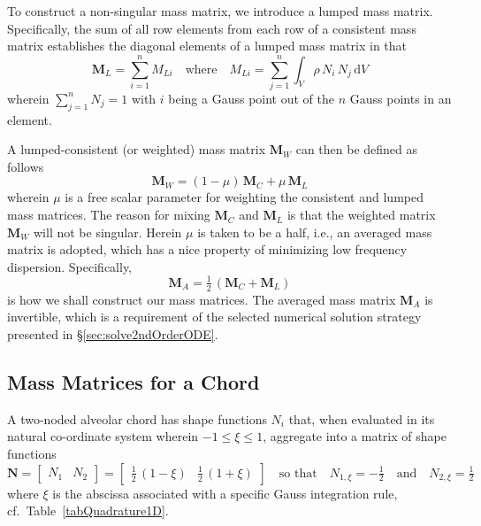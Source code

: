 To construct a non-singular mass matrix, we introduce a lumped mass matrix.  Specifically, the sum of all row elements from each row of a consistent mass matrix establishes the diagonal elements of a lumped mass matrix \cite{Reddy93} in that
\begin{equation}
\mathbf{M}_L = \sum_{i=1}^n M_{Li} 
\quad \text{where} \quad
M_{Li} = \sum_{j=1}^n \int_{V} \rho \, N_i \, N_j \, \mathrm{d} V 
\label{lumpedMassMatrix}
\end{equation}
wherein $\sum_{j=1}^n N_j = 1$ with $i$ being a Gauss point out of the $n$ Gauss points in an element.

A lumped-consistent (or weighted) mass matrix $\mathbf{M}_W $ can then be defined as follows
\begin{equation}
\mathbf{M}_W  = (1 - \mu) \, \mathbf{M}_{C} + \mu \, \mathbf{M}_{L}
\end{equation}
wherein $\mu$ is a free scalar parameter for weighting the consistent and lumped mass matrices.  The reason for mixing $\mathbf{M}_C$ and $\mathbf{M}_L$ is that the weighted matrix $\mathbf{M}_W$ will not be singular.  Herein $\mu$ is taken to be a half, i.e., an averaged mass matrix is adopted, which has a nice property of minimizing low frequency dispersion.  Specifically,
\begin{equation}
\mathbf{M}_A  = \tfrac{1}{2} \, (\mathbf{M}_{C} + \mathbf{M}_{L})
\label{LumconsMass}
\end{equation}
is how we shall construct our mass matrices.  The averaged mass matrix $\mathbf{M}_A$ is invertible, which is a requirement of the selected numerical solution strategy presented in \S\ref{sec:solve2ndOrderODE}.

\subsection{Mass Matrices for a Chord}

A two-noded alveolar chord has shape functions $N_i$ that, when evaluated in its natural co-ordinate system wherein $-1 \leq \xi \leq 1$, aggregate into a matrix of shape functions
\begin{equation}
\mathbf{N} = \begin{bmatrix} N_1 & N_2 \end{bmatrix} =
\begin{bmatrix}
\frac{1}{2} \, (1 - \xi) &  \frac{1}{2} \, (1 + \xi)
\end{bmatrix} 
\quad \text{so that} \quad
N_{1,\xi} = -\tfrac{1}{2} 
\quad \text{and} \quad
N_{2,\xi} = \tfrac{1}{2}
\end{equation}
where $\xi$ is the abscissa associated with a specific Gauss integration rule, cf.\ Table~\ref{tabQuadrature1D}.


